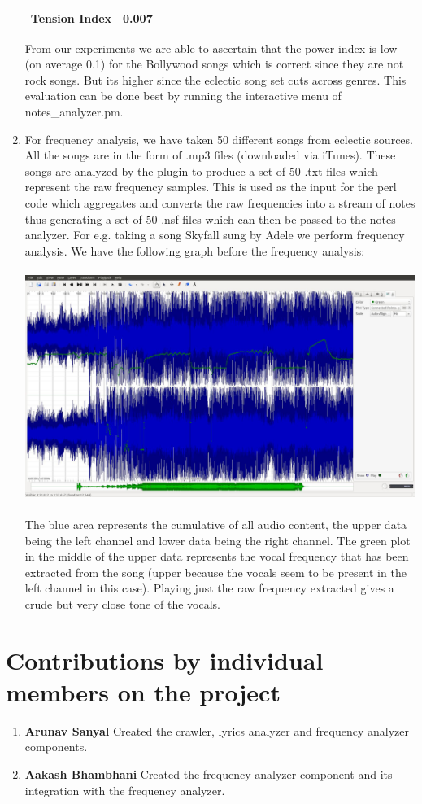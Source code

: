 \documentclass[letterpaper, 11pt]{article}
\begin{document}
\begin{enumerate}
\begin{center}
\begin{tabular}{ |c|c| }
 Tension Index & 0.007\\ 
 \hline
\end{tabular}
\end{center}
From our experiments we are able to ascertain that the power index is low (on average 0.1) for the Bollywood songs which is correct since they are not rock songs. But its higher since the eclectic song set cuts across genres. This evaluation can be done best by running the interactive menu of notes\_analyzer.pm.
\item For frequency analysis, we have taken 50 different songs from eclectic sources. All the songs are in the form of .mp3 files (downloaded via iTunes). These songs are analyzed by the plugin to produce a set of 50 .txt files which represent the raw frequency samples. This is used as the input for the perl code which aggregates and converts the raw frequencies into a stream of notes thus generating a set of 50 .nsf files which can then be passed to the notes analyzer. For e.g. taking a song Skyfall sung by Adele we perform frequency analysis. We have the following graph before the frequency analysis:\\\\
\includegraphics[width=\textwidth]{after.jpg}\\\\
The blue area represents the cumulative of all audio content, the upper data being the left channel and lower data being the right channel. The green plot in the middle of the upper data represents the vocal frequency that has been extracted from the song (upper because the vocals seem to be present in the left channel in this case). Playing just the raw frequency extracted gives a crude but very close tone of the vocals.
\end{enumerate}

\section*{Contributions by individual members on the project}
\begin{enumerate}
\item \textbf{Arunav Sanyal} Created the crawler, lyrics analyzer and frequency analyzer components.
\item \textbf{Aakash Bhambhani} Created the frequency analyzer component and its integration with the frequency analyzer.  
\end{enumerate}
\end{document}

